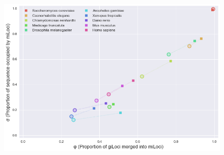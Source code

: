 \begin{figure}[!bht]
\centering
\includegraphics[width=6in]{Assets/Graphics/iLoci/compactness-shuffled.png}
\caption{~}
\label{Fig:CompactnessShuffled}
\end{figure}

\clearpage


